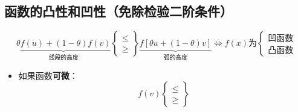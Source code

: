 \documentclass[12pt, a4paper, oneside]{article}
\begin{document}
\begin{CJK*}{UTF8}{gbsn}
\subsection{函数的凸性和凹性（免除检验二阶条件）}
\begin{figure}[H]
  \centering
\end{figure}
\noindent
$$
\underbrace{\theta f(u)+(1-\theta) f(v)}_{\text{线段的高度}} 
\left\{\begin{array}{c}\leqslant \\ \geqslant\end{array}\right\}
\underbrace{f\left[\theta u+(1-\theta) v\right]}_{\text{弧的高度}}
\Longleftrightarrow
f(x)\text{为}\left\{\begin{array}{c}\text{凹函数} \\ \text{凸函数}\end{array}\right.
$$
\begin{itemize}
	\item 如果函数\textbf{可微}：
		$$
		f(v)
		\left\{\begin{array}{c}\leqslant \\ \geqslant\end{array}\right\}
$$
\end{itemize}
\end{CJK*}
\end{document}
